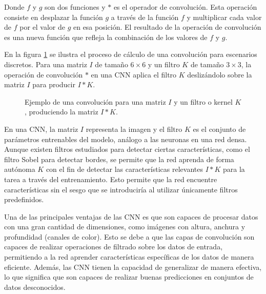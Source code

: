 Donde $f$ y $g$ son dos funciones y $*$ es el operador de convolución. Esta operación consiste en desplazar la función
$g$ a través de la función $f$ y multiplicar cada valor de $f$ por el valor de $g$ en esa posición. El resultado de la
operación de convolución es una nueva función que refleja la combinación de los valores de $f$ y $g$.

En la figura \ref{fig:convolucion-ejemplo} se ilustra el proceso de cálculo de una convolución para escenarios
discretos. Para una matriz $I$ de tamaño $6\times6$ y un filtro $K$ de tamaño $3\times3$, la operación de convolución
$*$ en una CNN aplica el filtro $K$ deslizándolo sobre la matriz $I$ para producir $I*K$.

\begin{figure}[H]
    \centering
    \caption[Operador {\it convolución}]{Ejemplo de una convolución para una matriz $I$ y un filtro o kernel $K$, produciendo la matriz $I*K$.}
    \label{fig:convolucion-ejemplo}
\end{figure}

En una CNN, la matriz $I$ representa la imagen y el filtro $K$ es el conjunto de parámetros entrenables del modelo,
análogo a las neuronas en una red densa. Aunque existen filtros estudiados para detectar ciertas características, como
el filtro Sobel para detectar bordes, se permite que la red aprenda de forma autónoma $K$ con el fin de detectar las
características relevantes $I*K$ para la tarea a través del entrenamiento. Esto permite que la red encuentre
características sin el sesgo que se introduciría al utilizar únicamente filtros predefinidos.

Una de las principales ventajas de las CNN es que son capaces de procesar datos con una gran cantidad de dimensiones,
como imágenes con altura, anchura y profundidad (canales de color). Esto se debe a que las capas de convolución son
capaces de realizar operaciones de filtrado sobre los datos de entrada, permitiendo a la red aprender características
específicas de los datos de manera eficiente. Además, las CNN tienen la capacidad de generalizar de manera efectiva, lo
que significa que son capaces de realizar buenas predicciones en conjuntos de datos desconocidos.

